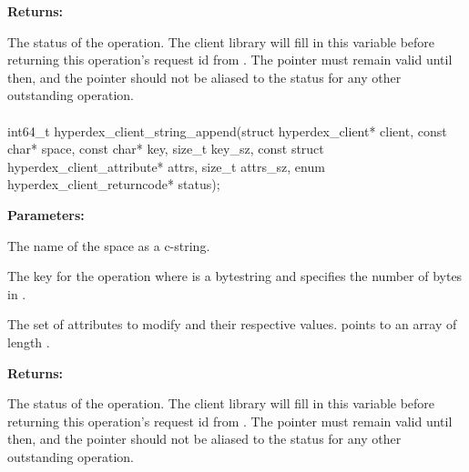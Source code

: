 \noindent\textbf{Returns:}
\begin{description}[labelindent=\widthof{{\code{status}}},leftmargin=*,noitemsep,nolistsep,align=right]
\item[\code{status}] The status of the operation.  The client library will fill in this variable before returning this operation's request id from .  The pointer must remain valid until then, and the pointer should not be aliased to the status for any other outstanding operation.
\end{description}

\paragraph{}
\label{api:c:string_append}
\begin{ccode}
int64_t hyperdex_client_string_append(struct hyperdex_client* client,
        const char* space,
        const char* key, size_t key_sz,
        const struct hyperdex_client_attribute* attrs, size_t attrs_sz,
        enum hyperdex_client_returncode* status);
\end{ccode}
\funcdesc 

\noindent\textbf{Parameters:}
\begin{description}[labelindent=\widthof{{\code{attrs}, \code{attrs\_sz}}},leftmargin=*,noitemsep,nolistsep,align=right]
\item[\code{space}] The name of the space as a c-string.
\item[\code{key}, \code{key\_sz}] The key for the operation where  is a bytestring and  specifies the number of bytes in .
\item[\code{attrs}, \code{attrs\_sz}] The set of attributes to modify and their respective values.   points to an array of length .
\end{description}

\noindent\textbf{Returns:}
\begin{description}[labelindent=\widthof{{\code{status}}},leftmargin=*,noitemsep,nolistsep,align=right]
\item[\code{status}] The status of the operation.  The client library will fill in this variable before returning this operation's request id from .  The pointer must remain valid until then, and the pointer should not be aliased to the status for any other outstanding operation.
\end{description}

